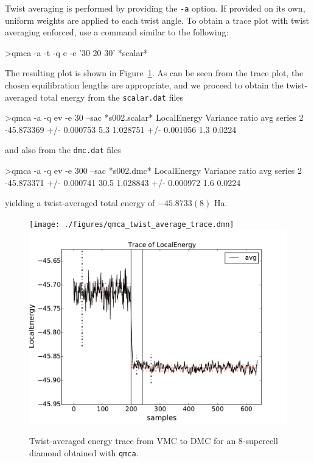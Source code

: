 Twist averaging is performed by providing the \texttt{-a} 
option.  If provided on its own, uniform weights are applied 
to each twist angle.  To obtain a trace plot with twist averaging 
enforced, use a command similar to the following:
\begin{shade}
>qmca -a -t -q e -e '30 20 30' *scalar*
\end{shade}
\noindent
The resulting plot is shown in Figure~\ref{fig:qmca_twist_average}.
As can be seen from the trace plot, the chosen equilibration lengths 
are appropriate, and we proceed to obtain the twist-averaged total energy
from the \texttt{scalar.dat} files
\begin{shade}
>qmca -a -q ev -e 30 --sac *s002.scalar*
                            LocalEnergy               Variance           ratio 
avg  series 2  -45.873369 +/- 0.000753    5.3   1.028751 +/- 0.001056    1.3   0.0224 
\end{shade}
\noindent
and also from the \texttt{dmc.dat} files
\begin{shade}
>qmca -a -q ev -e 300 --sac *s002.dmc*
                            LocalEnergy               Variance           ratio 
avg  series 2  -45.873371 +/- 0.000741   30.5   1.028843 +/- 0.000972    1.6   0.0224 
\end{shade}
\noindent
yielding a twist-averaged total energy of $-45.8733(8)$ Ha. 

\begin{figure}
\begin{center}
\ifdefined\HCode
\texttt{[image: ./figures/qmca\_twist\_average\_trace.dmn]}
\else
\includegraphics[trim = 0mm 0mm 0mm 0mm, clip,width=0.75\columnwidth]{./figures/qmca_twist_average_trace.pdf}
\fi
\end{center}
\caption{Twist-averaged energy trace from VMC to DMC for an 8-supercell diamond obtained with \texttt{qmca}.}
\label{fig:qmca_twist_average}
\end{figure}

